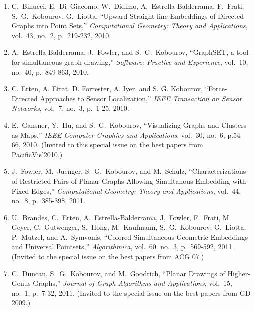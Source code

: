 \documentclass[10pt]{article}
\begin{document}
\begin{description}
\begin{enumerate}
\item \label{use}
C.~Binucci, E.~Di~Giacomo, W.~Didimo, A.~Estrella-Balderrama, F.~Frati, S.~G.~Kobourov, G.~Liotta, ``Upward Straight-line Embeddings of Directed Graphs into Point Sets,'' {\em Computational Geometry: Theory and Applications}, vol.~43, no.~2, p.~219-232, 2010.


\item \label{graphset}
A.~Estrella-Balderrama, J.~Fowler, and S.~G.~Kobourov, ``GraphSET, a
tool for simultaneous graph drawing,'' {\em Software: Practice and
  Experience}, vol.~10, no.~40, p.~849-863, 2010.


\item
C. Erten, A. Efrat, D. Forrester, A. Iyer, and S. G. Kobourov,
``Force-Directed Approaches to Sensor Localization,'' {\em IEEE
  Transaction on Sensor Networks}, vol.~7, no.~3, p.~1-25, 2010.


\item \label{gmap} E.~Gansner, Y.~Hu, and S.~G.~Kobourov, ``Visualizing Graphs and Clusters as Maps,''
{\em IEEE Computer Graphics and Applications}, vol.~30, no.~6, p.54--66, 2010. (Invited to this special issue on the best papers from  PacificVis'2010.)

\item \label{sefe} 
J.~Fowler, M.~Juenger, S.~G.~Kobourov, and M.~Schulz,
``Characterizations of Restricted Pairs of Planar Graphs Allowing
Simultanous Embedding with Fixed Edges,''  {\em Computational  Geometry: Theory and Applications}, vol.~44, no.~8, p.~385-398, 2011.

\item \label{cse} U.~Brandes, C.~Erten, A.~Estrella-Balderrama,
  J,~Fowler, F.~Frati, M.~ Geyer, C.~Gutwenger, S.~Hong, M.~Kaufmann,
  S.~G.~Kobourov, G.~Liotta, P.~Mutzel, and A.~Symvonis, ``Colored
  Simultaneous Geometric Embeddings and Universal Pointsets,'' {\em
    Algorithmica},  vol.~60. no.~3, p.~569-592, 2011. (Invited to the
  special issue on the best papers from ACG 07.)

\item \label{genus} C.~Duncan, S.~G.~Kobourov, and M.~Goodrich,
  ``Planar Drawings of Higher-Genus Graphs,'' {\em Journal of Graph
    Algorithms and Applications}, vol.~15, no.~1, p.~7-32, 2011.  (Invited to the special issue on the best papers from GD 2009.)



\end{enumerate}
\end{description}
\end{document}
